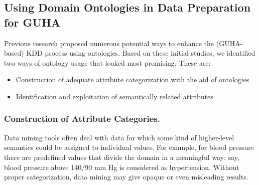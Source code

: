 

\subsection{Using Domain Ontologies in Data Preparation for GUHA}
\label{OntologiesDataPrep}

Previous research \cite{Cespivova,Ralbovsky} proposed numerous potential ways to enhance the (GUHA-based) KDD process using ontologies. 
Based on these initial studies, we identified two ways of ontology usage that looked most promising. 
These are:
\begin{itemize}
	\item Construction of adequate attribute categorization with the aid of ontologies
	\item Identification and exploitation of semantically related attributes
\end{itemize}

\subsubsection{Construction of Attribute Categories.}

Data mining tools often deal with data for which some kind of higher-level semantics could be assigned to individual values.
For example, for blood pressure there are predefined values that divide the domain in a meaningful way: say, blood pressure above 140/90 mm Hg is considered as hypertension. 
Without proper categorization, data mining may give opaque or even misleading results.

